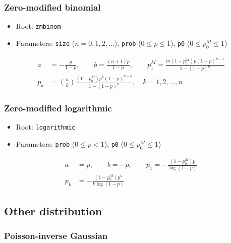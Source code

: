 \documentclass[x11names]{article}
\newcommand{\code}[1]{\texttt{#1}}
\begin{document}
\subsubsection{Zero-modified binomial}

\begin{itemize}
\item Root: \code{zmbinom}
\item Parameters: \code{size} ($n = 0, 1, 2, \dots$),
  \code{prob} ($0 \leq p \leq 1$),
  \code{p0} ($0 \leq p_0^M \leq 1$)
\end{itemize}
\begin{align*}
  a &= -\frac{p}{1 - p}, \qquad b = \frac{(n + 1)p}{1 - p}, \qquad
      p_1^M = \frac{m (1 - p_0^M) p (1 - p)^{n - 1}}{1 - (1 - p)^n} \\
  p_k &= \binom{n}{k} \frac{(1 - p_0^M) p^k (1 - p)^{n - k}}{1 - (1 - p)^n}, \quad
        k = 1, 2, \dots, n
\end{align*}

\subsubsection{Zero-modified logarithmic}

\begin{itemize}
\item Root: \code{logarithmic}
\item Parameters: \code{prob} ($0 \leq p < 1$),
  \code{p0} ($0 \leq p_0^M \leq 1$)
\end{itemize}
\begin{align*}
  a &= p, \qquad b = -p, \qquad
      p_1 = - \frac{(1 - p_0^M) p}{\log (1 - p)} \\
  p_k &= - \frac{(1 - p_0^M) p^k}{k \log (1 - p)}
\end{align*}


\subsection{Other distribution}

\subsubsection{Poisson-inverse Gaussian}
\label{sec:app:discrete:pig}
\end{document}
